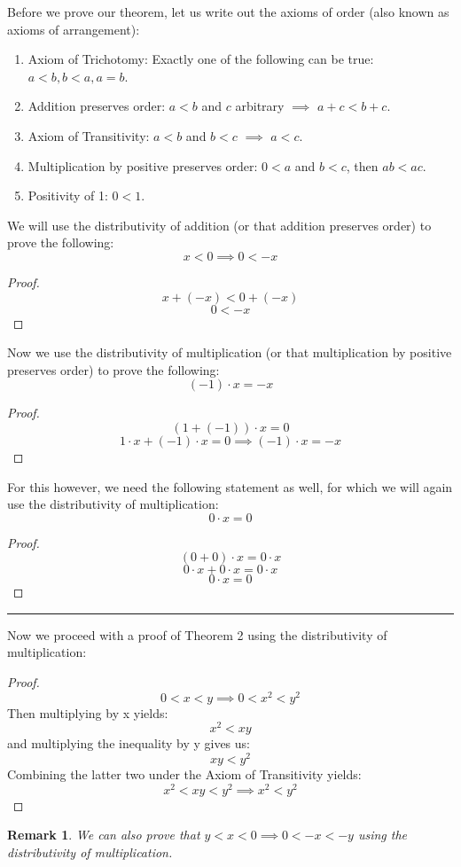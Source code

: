 \documentclass{article}
\newtheorem{remark}{Remark}
\begin{document}
Before we prove our theorem, let us write out the axioms of order (also known as axioms of arrangement):
\begin{enumerate}
    \item Axiom of Trichotomy: Exactly one of the following can be true: $a < b, b < a, a = b$.
    \item Addition preserves order: $a < b$ and $c$ arbitrary $\implies$ $a + c < b + c$.
    \item  Axiom of Transitivity: $a < b$ and $b < c$ $\implies$ $a < c$.
    \item Multiplication by positive preserves order: $0 < a$ and $b < c$, then $ab < ac$.
    \item Positivity of 1: $0 < 1$.
\end{enumerate}
We will use the distributivity of addition (or that addition preserves order) to prove the following:
\[
    x < 0 \implies 0 < -x
\]
\begin{proof}
\[
    x + (-x) < 0 + (-x)
\]
\[
    0 < -x
\]
\end{proof}
Now we use the distributivity of multiplication (or that multiplication by positive preserves order) to prove the following:
\[
    (-1)\cdot x = -x
\]
\begin{proof}
\[
    (1 + (-1)) \cdot x = 0
\]
\[
    1 \cdot x + (-1) \cdot x = 0 \implies (-1) \cdot x = -x
\]
\end{proof}
For this however, we need the following statement as well, for which we will again use the distributivity of multiplication:
\[
    0\cdot x = 0
\]
\begin{proof}
\[
    (0+0) \cdot x = 0 \cdot x
\]
\[
    0 \cdot x + 0 \cdot x = 0 \cdot x
\]
\[
    0 \cdot x = 0
\]
\end{proof}

\hrule
\vspace{1em}

Now we proceed with a proof of Theorem 2 using the distributivity of multiplication:

\begin{proof}
    \[
    0 < x < y \implies 0 < x^2 < y^2
    \]
    Then multiplying by x yields:
    \[
    x^2 < xy
    \]
    and multiplying the inequality by y gives us:
    \[
    xy < y^2
    \]
    Combining the latter two under the Axiom of Transitivity yields:
    \[
    x^2 < xy < y^2 \implies x^2 < y^2
    \]
\end{proof}

\begin{remark}
    We can also prove that $y < x < 0 \implies 0 < -x < -y$ using the distributivity of multiplication.
\end{remark}
\end{document}
